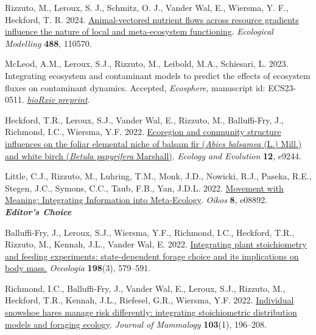 \begin{etaremune}
  \renewcommand\labelenumi{\bfseries\theenumi .}
  \item \textcolor{awesome}{Rizzuto, M.}, Leroux, S. J., Schmitz, O. J., Vander Wal, E., Wiersma, Y. F., Heckford, T. R. 2024. \href{https://doi.org/10.1016/j.ecolmodel.2023.110570}{Animal-vectored nutrient flows across resource gradients influence the nature of local and meta-ecosystem functioning}. \emph{Ecological Modelling} \textbf{488}, 110570. 
  \item McLeod, A.M., Leroux, S.J., \textcolor{awesome}{Rizzuto, M.}, Leibold, M.A., Schiesari, L. 2023. Integrating ecosystem and contaminant models to predict the effects of ecosystem fluxes on contaminant dynamics. Accepted, \emph{Ecosphere}, manuscript id: ECS23-0511. \href{https://doi.org/10.1101/2023.07.15.549171}{\emph{bioRxiv preprint}}.
  \item Heckford, T.R., Leroux, S.J., Vander Wal, E., \textcolor{awesome}{Rizzuto, M.}, Balluffi-Fry, J., Richmond, I.C., Wiersma, Y.F. 2022. \href{https://doi.org/10.1002/ece3.9244}{Ecoregion and community structure influences on the foliar elemental niche of balsam fir (\textit{Abies balsamea} (L.) Mill.) and white birch (\textit{Betula papyrifera} Marshall)}. \emph{Ecology and Evolution} \textbf{12}, e9244. 
  \item Little, C.J.\textsuperscript{\textdagger}, \textcolor{awesome}{Rizzuto, M.}\textsuperscript{\textdagger}, Luhring, T.M., Monk, J.D., Nowicki, R.J., Paseka, R.E., Stegen, J.C., Symons, C.C., Taub, F.B., Yan, J.D.L. 2022. \href{https://doi.org/10.1111/oik.08892}{Movement with Meaning: Integrating Information into Meta-Ecology}. \emph{Oikos} \textbf{8}, e08892.\\ \null\hfill\textbf{\textit{Editor's Choice}}
  \item Balluffi-Fry, J., Leroux, S.J., Wiersma, Y.F., Richmond, I.C., Heckford, T.R., \textcolor{awesome}{Rizzuto, M.}, Kennah, J.L., Vander Wal, E. 2022. \href{https://rdcu.be/cAY5a}{Integrating plant stoichiometry and feeding experiments: state-dependent forage choice and its implications on body mass.} \emph{Oecologia} \textbf{198}(3), 579--591.
  \item Richmond, I.C., Balluffi-Fry, J., Vander Wal, E., Leroux, S.J., \textcolor{awesome}{Rizzuto, M.}, Heckford, T.R., Kennah, J.L., Riefesel, G.R., Wiersma, Y.F. 2022. \href{https://academic.oup.com/jmammal/advance-article/doi/10.1093/jmammal/gyab130/6441781?guestAccessKey=8f89e422-7fb9-4ce9-a9dc-ccf46f3dd0cc}{Individual snowshoe hares manage risk differently: integrating stoichiometric distribution models and foraging ecology}. \emph{Journal of Mammalogy} \textbf{103}(1), 196--208.

\end{etaremune}

